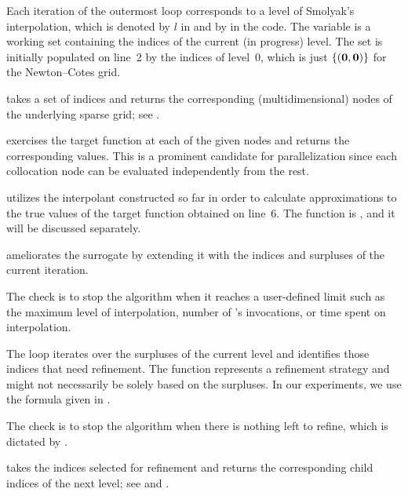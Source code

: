 \begin{compactlist}

 Each iteration of the outermost loop corresponds to a level of
Smolyak's interpolation, which is denoted by $l$ in 
and by  in the code. The  variable is a working set
containing the indices of the current (in progress) level. The set is initially
populated on line~2 by the indices of level~0, which is just $\{ (\mathbf{0}, \mathbf{0})
\}$ for the Newton--Cotes grid.

  takes a set of indices and returns the
corresponding (multidimensional) nodes of the underlying sparse grid; see
.

  exercises the target function at each of the
given nodes and returns the corresponding values. This is a prominent candidate
for parallelization since each collocation node can be evaluated independently
from the rest.

  utilizes the interpolant constructed so far in
order to calculate approximations to the true values of the target function
obtained on line~6. The  function is , and it
will be discussed separately.

  ameliorates the surrogate by extending it
with the indices and surpluses of the current iteration.

 The check is to stop the algorithm when it reaches a
user-defined limit such as the maximum level of interpolation, number of
's invocations, or time spent on interpolation.

 The loop iterates over the surpluses of the current level and
identifies those indices that need refinement. The  function
represents a refinement strategy and might not necessarily be solely based on
the surpluses. In our experiments, we use the formula given in .

 The check is to stop the algorithm when there is nothing left
to refine, which is dictated by .

  takes the indices selected for
refinement and returns the corresponding child indices of the next level; see
 and .

\end{compactlist}


